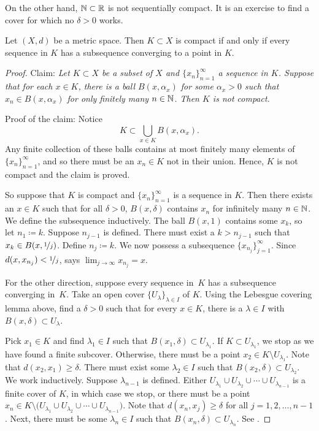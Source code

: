 On the other hand, ${\mathbb{N}} \subset {\mathbb{R}}$ is not sequentially compact.
It is an exercise to find a cover for which no $\delta > 0$ works.


\begin{thm} \label{thm:mscompactisseqcpt}
Let $(X,d)$ be a metric space.  Then $K \subset X$ is compact if
and only if every sequence in $K$ has a subsequence converging to
a point in $K$.
\end{thm}

\begin{proof}
Claim: \emph{Let $K \subset X$ be a subset of $X$ and
$\{ x_n \}_{n=1}^\infty$ a sequence in $K$.  Suppose that for each $x \in K$,
there is a ball $B(x,\alpha_x)$ for some $\alpha_x > 0$ such that
$x_n \in B(x,\alpha_x)$ for only finitely many $n \in {\mathbb{N}}$.
Then $K$ is not compact.}

Proof of the claim:
Notice
\begin{equation*}
K \subset \bigcup_{x \in K} B(x,\alpha_x) .
\end{equation*}
Any finite collection of these balls contains at most finitely many
elements of $\{ x_n \}_{n=1}^\infty$,
and so there must be an $x_n \in K$
not in their union.  Hence, $K$ is not compact and the claim is
proved.

So suppose that $K$ is compact and $\{ x_n \}_{n=1}^\infty$ is a sequence in $K$.
Then there exists an $x \in K$ such that
for all $\delta > 0$,
$B(x,\delta)$ contains $x_n$ for infinitely many $n \in {\mathbb{N}}$.
We define the subsequence inductively.
The ball $B(x,1)$ contains some $x_k$, so let $n_1 \coloneqq k$.
Suppose $n_{j-1}$ is defined.
There must exist a $k > n_{j-1}$
such that $x_k \in B(x,\nicefrac{1}{j})$.  Define
$n_j \coloneqq k$.
We now possess a subsequence $\{ x_{n_j} \}_{j=1}^\infty$.
Since
$d(x,x_{n_j}) < \nicefrac{1}{j}$,   says
$\lim_{j\to\infty} x_{n_j} = x$.

For the other direction, suppose every sequence in~$K$
has a 
subsequence converging in~$K$.
Take
an open cover $\{ U_\lambda \}_{\lambda \in I}$ of $K$.
Using the Lebesgue covering lemma above, find a $\delta > 0$
such that for every $x \in K$, there is a $\lambda \in I$ with
$B(x,\delta) \subset U_\lambda$.

Pick $x_1 \in K$ and find $\lambda_1 \in I$ such that $B(x_1,\delta) \subset
U_{\lambda_1}$.
If $K \subset U_{\lambda_1}$, we stop as we have found a
finite subcover.
Otherwise, there must be
a point $x_2 \in K \setminus U_{\lambda_1}$.
Note that $d(x_2,x_1) \geq \delta$.
There must exist some $\lambda_2 \in I$ such that
$B(x_2,\delta) \subset U_{\lambda_2}$.
We work inductively.  Suppose $\lambda_{n-1}$ is defined.
Either
$U_{\lambda_1} \cup
U_{\lambda_2} \cup \cdots \cup
U_{\lambda_{n-1}}$ is a finite cover of $K$, in which case we
stop, or
there must be 
a point $x_n \in K \setminus \bigl( U_{\lambda_1} \cup
U_{\lambda_2} \cup \cdots \cup
U_{\lambda_{n-1}}\bigr)$.
Note that $d(x_n,x_j) \geq \delta$ for all $j = 1,2,\ldots,n-1$.
Next, there must be some $\lambda_n \in I$
such that $B(x_n,\delta) \subset U_{\lambda_n}$.
See .


\end{proof}
